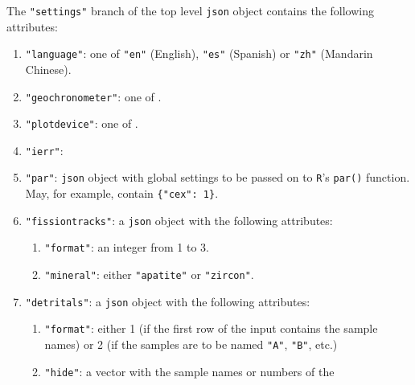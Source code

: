 \begin{refsection}
\noindent The \texttt{"settings"} branch of the top level
\texttt{json} object contains the following attributes:

\begin{enumerate}[leftmargin=\parindent,align=left,
      labelwidth=\parindent,label*=2.\arabic*.]
\item{\tt "language"}: one of \texttt{"en"} (English), \texttt{"es"}
  (Spanish) or \texttt{"zh"} (Mandarin Chinese).
\item{\tt "geochronometer"}: one of .
\item{\tt "plotdevice"}: one of .
\item{\tt "ierr"}: 
\item{\tt "par"}: \texttt{json} object with global settings to be
  passed on to \texttt{R}'s \texttt{par()} function. May, for example,
  contain \texttt{\{"cex": 1\}}.
\item{\tt "fissiontracks"}: a \texttt{json} object with the following
  attributes:
  \begin{enumerate}[leftmargin=\parindent,align=left,labelwidth=\parindent,label*=\arabic*.]
  \item{\tt "format"}: an integer from 1 to 3.
  \item{\tt "mineral"}: either \texttt{"apatite"} or \texttt{"zircon"}.
  \end{enumerate}
\item{\tt "detritals"}: a \texttt{json} object with the following
  attributes:
  \begin{enumerate}[leftmargin=\parindent,align=left,labelwidth=\parindent,label*=\arabic*.]
  \item{\tt "format"}: either 1 (if the first row of the input
    contains the sample names) or 2 (if the samples are to be named
    \texttt{"A"}, \texttt{"B"}, etc.)
  \item{\tt "hide"}: a vector with the sample names or numbers of the

\end{enumerate}
\end{enumerate}
\end{refsection}
